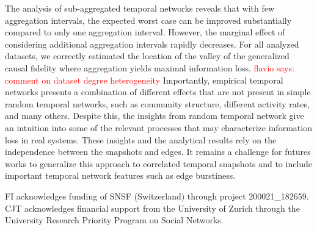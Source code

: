 \documentclass[%
 reprint,
 amsmath,amssymb,
 aps,
]{revtex4-2}
\newcommand{\fla}[1]{\textcolor{red}{flavio says: #1}}
\begin{document}
The analysis of sub-aggregated temporal networks reveals that with few aggregation intervals, the expected worst case can be improved substantially compared to only one aggregation interval.  
However, the marginal effect of considering additional aggregation intervals rapidly decreases.
For all analyzed datasets,  
we correctly estimated the location of the valley of the generalized causal fidelity where aggregation yields maximal information loss.  
\fla{comment on dataset degree heterogeneity}
Importantly, empirical temporal networks presents a combination of different  effects that are not present in simple random temporal networks, such as community structure, different activity rates, and many others. 
Despite this, the insights from random temporal network give an intuition into some of the relevant processes that may characterize information loss in real systems.  These insights and the analytical results rely on the independence between the snapshots and edges. 
It remains a challenge for futures works to generalize this approach to correlated temporal snapshots and to include important temporal network features such as edge burstiness.


\vspace{0.5cm}
\begin{acknowledgments}
 FI acknowledges funding of SNSF (Switzerland) through project  200021\_182659. CJT acknowledges financial support from the  University of Zurich through the University Research Priority Program on Social Networks. 
\end{acknowledgments}




\end{document}
